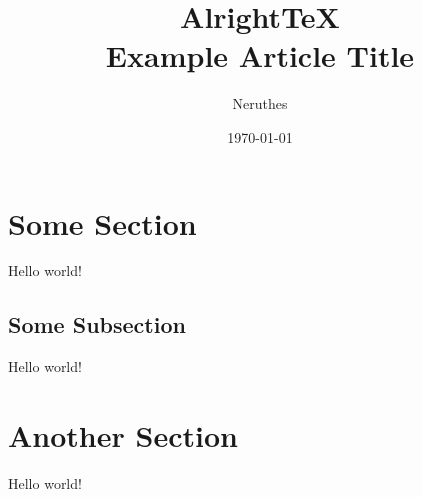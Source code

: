 \documentclass[11pt,a4paper]{article}
\title{AlrightTeX\\Example Article Title}
\author{Neruthes}
\date{\today}
\begin{document}
\maketitle

\tableofcontents

\section{Some Section}
Hello world!

\lipsum[1-3][1-5]

\subsection{Some Subsection}
Hello world!

\lipsum[1-3][1-5]



\section{Another Section}
Hello world!

\lipsum[1-3][1-5]
\end{document}
